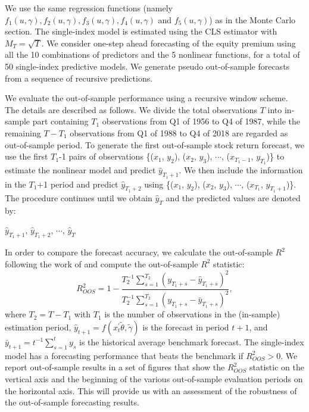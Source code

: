 \documentclass[a4paper,12pt,times,numbered,print,index]{report}
\numberwithin{equation}{section}
\begin{document}
	We use the same regression functions (namely $f_{1}\left( u,\gamma\right), f_{2}\left( u,\gamma\right), f_{3}\left( u,\gamma\right), f_{4}\left( u,\gamma \right)$ and $f_{5}\left( u,\gamma\right)$) as in the Monte Carlo section. The single-index model is estimated using the CLS estimator with $M_{T}=\sqrt{T}$.  We consider one-step ahead forecasting of the equity premium using all the 10 combinations of predictors and the 5 nonlinear functions, for a total of 50 single-index predictive models. We generate pseudo out-of-sample forecasts from a sequence of recursive predictions. 
	
	We evaluate the out-of-sample performance using a recursive window scheme. The details are described as follows. We divide the total observations $T$ into in-sample part containing $T_1$ observations from Q1 of 1956 to Q4 of 1987, while the remaining $T-T_1$ observations from Q1 of 1988 to Q4 of 2018 are regarded as out-of-sample period. To generate the first out-of-sample stock return forecast, we use the first $T_1$-1 pairs of observations \{($x_1$, $y_2$), ($x_2$, $y_3$), $\cdots$, ($x_{T_1-1}$, $y_{T_1}$)\} to estimate the nonlinear model and predict $\hat{y}_{T_1+1}$. We then include the information in the $T_1$+1 period and predict  $\hat{y}_{T_1+2}$ using \{($x_1$, $y_2$), ($x_2$, $y_3$), $\cdots$, ($x_{T_1}$, $y_{T_1+1}$)\}. The procedure continues until we obtain $\hat{y}_{T}$ and the predicted values are denoted by:
	\begin{center}
		$\hat{y}_{T_1+1}$, $\hat{y}_{T_1+2}$, $\cdots$, $\hat{y}_{T}$
	\end{center}
	
	In order to compare the forecast accuracy, we calculate the out-of-sample $R^2$ following the work of \cite{campbell2008predicting} and compute the out-of-sample $R^2$ statistic:
	\[
	R_{OOS}^{2}=1-\frac{T_{2}^{-1}\sum_{s=1}^{T_{2}}\left( y_{T_{1}+s}-\hat{y}%
		_{T_{1}+s}\right) ^{2}}{T_{2}^{-1}\sum_{s=1}^{T_{2}}\left( y_{T_{1}+s}-\bar{y%
		}_{T_{1}+s}\right) ^{2}},
	\]
	where $T_{2} = T- T_{1} $ with $T_{1}$ is the number of observations in the (in-sample) estimation period, $\hat{y}_{t+1} = f\left( x_{t}^{\prime }\tilde{\theta },\tilde{\gamma}\right)$ is the forecast in period $t+1$,  and $\bar{y}_{t+1}=t^{-1}\sum_{s=1}^{t}y_{s}$ is the historical average benchmark forecast. The single-index model has a forecasting performance that beats the benchmark if $ R^2_{OOS}>0 $. We report out-of-sample results in a set of figures that show the $R_{OOS}^{2}$ statistic on the vertical axis and the beginning of the various out-of-sample evaluation periods on the horizontal axis. This will provide us with an assessment of the robustness of the out-of-sample forecasting results.
	
\end{document}
